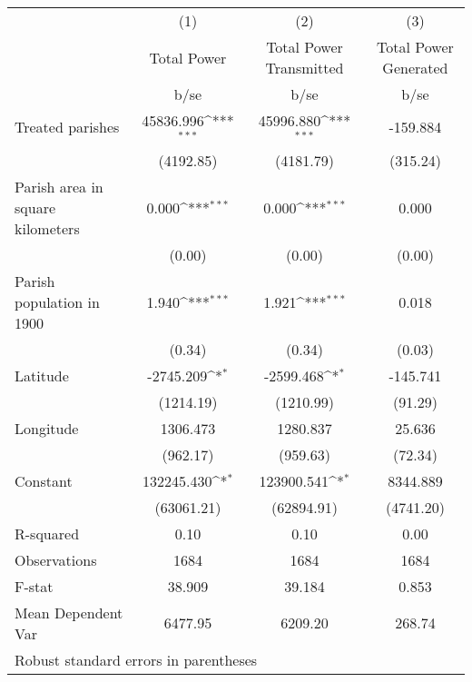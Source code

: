 {
\def\sym#1{\ifmmode^{#1}\else\(^{#1}\)\fi}
\begin{tabular}{l*{3}{c}}
\hline\hline
                    &\multicolumn{1}{c}{(1)}         &\multicolumn{1}{c}{(2)}         &\multicolumn{1}{c}{(3)}         \\
                    & Total Power         &Total Power Transmitted         &Total Power Generated         \\
                    &        b/se         &        b/se         &        b/se         \\
\hline
Treated parishes    &   45836.996\sym{***}&   45996.880\sym{***}&    -159.884         \\
                    &   (4192.85)         &   (4181.79)         &    (315.24)         \\
Parish area in square kilometers&       0.000\sym{***}&       0.000\sym{***}&       0.000         \\
                    &      (0.00)         &      (0.00)         &      (0.00)         \\
Parish population in 1900&       1.940\sym{***}&       1.921\sym{***}&       0.018         \\
                    &      (0.34)         &      (0.34)         &      (0.03)         \\
Latitude            &   -2745.209\sym{*}  &   -2599.468\sym{*}  &    -145.741         \\
                    &   (1214.19)         &   (1210.99)         &     (91.29)         \\
Longitude           &    1306.473         &    1280.837         &      25.636         \\
                    &    (962.17)         &    (959.63)         &     (72.34)         \\
Constant            &  132245.430\sym{*}  &  123900.541\sym{*}  &    8344.889         \\
                    &  (63061.21)         &  (62894.91)         &   (4741.20)         \\
\hline
R-squared           &        0.10         &        0.10         &        0.00         \\
Observations        &        1684         &        1684         &        1684         \\
F-stat              &      38.909         &      39.184         &       0.853         \\
Mean Dependent Var  &     6477.95         &     6209.20         &      268.74         \\
\hline\hline
\multicolumn{4}{l}{\footnotesize Robust standard errors in parentheses}\\
\end{tabular}
}
